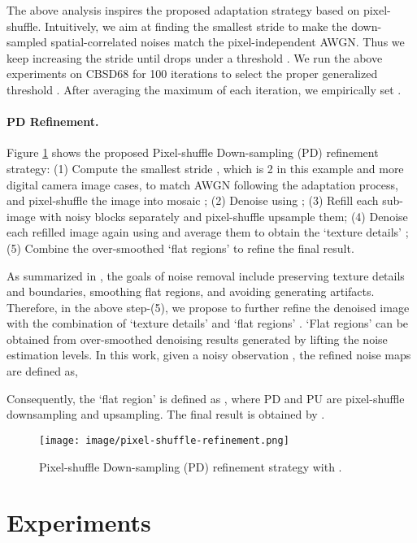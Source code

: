 \documentclass[letterpaper]{article} \usepackage{aaai20}  \usepackage{times}  \usepackage{helvet} \usepackage{courier}  \usepackage{comment}
\begin{document}
The above analysis inspires the proposed adaptation strategy based on pixel-shuffle. Intuitively, we aim at finding the smallest stride  to make the down-sampled spatial-correlated noises match the pixel-independent AWGN. Thus we keep increasing the stride  until  drops under a threshold . We run the above experiments on CBSD68 for 100 iterations to select the proper generalized threshold . After averaging the maximum  of each iteration, we empirically set . 


\paragraph{PD Refinement.} 
Figure \ref{fig:ps_pipeline} shows the proposed Pixel-shuffle Down-sampling (PD) refinement strategy: (1) Compute the smallest stride , which is 2 in this example and more digital camera image cases, to match 
AWGN following the adaptation process, and pixel-shuffle the image into mosaic ; (2) Denoise  using ; (3) Refill each sub-image with noisy blocks separately and pixel-shuffle upsample them; (4) Denoise each refilled image again using  and average them to obtain the `texture details' ; (5) Combine the over-smoothed `flat regions'  to refine the final result. 

As summarized in \cite{liu2008automatic}, the goals of noise removal include preserving texture details and boundaries, smoothing flat regions, and avoiding generating artifacts. Therefore, in the above step-(5), we propose to further refine the denoised image with the combination of `texture details'  and `flat regions' . `Flat regions' can be obtained from over-smoothed denoising results generated by lifting the noise estimation levels. In this work, given a noisy observation , the refined noise maps are defined as,


Consequently, the `flat region' is defined as  , where PD and PU are pixel-shuffle downsampling and upsampling. The final result is obtained by .

\begin{figure}[t]
	\begin{center}
		\texttt{[image: image/pixel-shuffle-refinement.png]}
	\end{center}
	\vspace{-6mm}
	\caption{Pixel-shuffle Down-sampling (PD) refinement strategy with .}
	\label{fig:ps_pipeline}
\end{figure}

 \section{Experiments}
\end{document}
